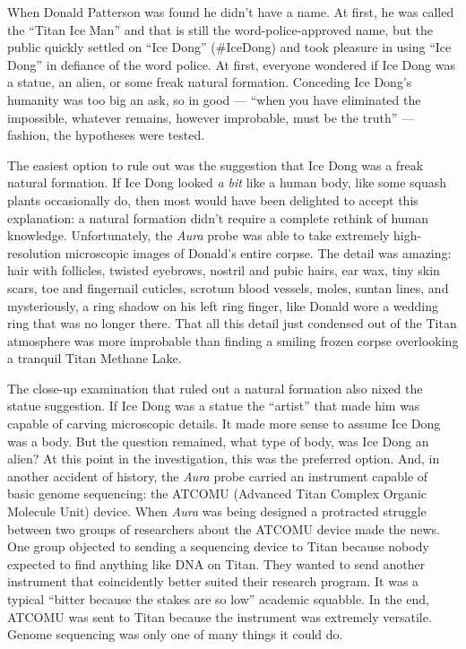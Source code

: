 When Donald Patterson was found he didn't have a name. At first, he was
called the ``Titan Ice Man'' and that is still the word-police-approved
name, but the public quickly settled on ``Ice Dong'' (\#IceDong) and
took pleasure in using ``Ice Dong'' in defiance of the word police. At
first, everyone wondered if Ice Dong was a statue, an alien, or some
freak natural formation. Conceding Ice Dong's humanity was too big an
ask, so in good --- ``when you have eliminated the impossible, whatever
remains, however improbable, must be the truth'' --- fashion, the
hypotheses were tested.

The easiest option to rule out was the suggestion that Ice Dong was a
freak natural formation. If Ice Dong looked \emph{a bit} like a human
body, like some squash plants occasionally do, then most would have been
delighted to accept this explanation: a natural formation didn't require
a complete rethink of human knowledge. Unfortunately, the \emph{Aura}
probe was able to take extremely high-resolution microscopic images of
Donald's entire corpse. The detail was amazing: hair with follicles,
twisted eyebrows, nostril and pubic hairs, ear wax, tiny skin scars, toe
and fingernail cuticles, scrotum blood vessels, moles, suntan lines, and
mysteriously, a ring shadow on his left ring finger, like Donald wore a
wedding ring that was no longer there. That all this detail just
condensed out of the Titan atmosphere was more improbable than finding a
smiling frozen corpse overlooking a tranquil Titan Methane Lake.

The close-up examination that ruled out a natural formation also nixed
the statue suggestion. If Ice Dong was a statue the ``artist'' that made
him was capable of carving microscopic details. It made more sense to
assume Ice Dong was a body. But the question remained, what type of
body, was Ice Dong an alien? At this point in the investigation, this
was the preferred option. And, in another accident of history, the
\emph{Aura} probe carried an instrument capable of basic genome
sequencing: the ATCOMU (Advanced Titan Complex Organic Molecule Unit)
device. When \emph{Aura} was being designed a protracted struggle
between two groups of researchers about the ATCOMU device made the news.
One group objected to sending a sequencing device to Titan because
nobody expected to find anything like DNA on Titan. They wanted to send
another instrument that coincidently better suited their research
program. It was a typical ``bitter because the stakes are so low''
academic squabble. In the end, ATCOMU was sent to Titan because the
instrument was extremely versatile. Genome sequencing was only one of
many things it could do.

